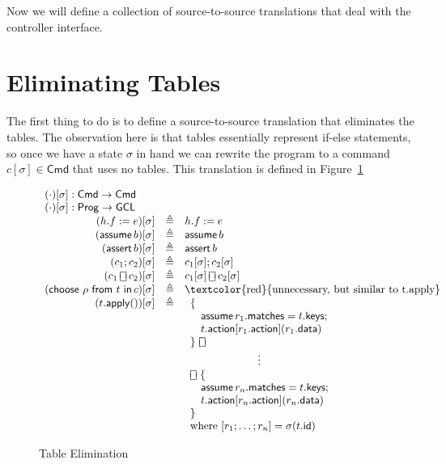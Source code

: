 \documentclass{article}
\newcommand{\Cmd}{\mathsf{Cmd}}
\newcommand{\Prog}{\mathsf{Prog}}
\newcommand{\GCL}{\mathsf{GCL}}
\newcommand{\matches}{\mathsf{matches}}
\newcommand{\action}{\mathsf{action}}
\newcommand{\keys}{\mathsf{keys}}
\newcommand{\data}{\mathsf{data}}
\newcommand{\id}{\mathsf{id}}
\newcommand{\assert}{\mathop{\mathsf{assert}}}
\newcommand{\assume}{\mathop{\mathsf{assume}}}
\newcommand{\apply}{\mathsf{apply}}
\newcommand{\choiceop}{\rotatebox[origin=c]{90}{$\sqsubset\!\!\!\sqsupset$}}
\newcommand{\choice}{\mathbin{\choiceop}}
\renewcommand{\choose}[2]{\mathop{\mathsf{choose}~#1~\mathsf{from}~#2~\mathsf{in}}}
\begin{document}
Now we will define a collection of source-to-source translations that deal with
the controller interface.

\section{Eliminating Tables}

The first thing to do is to define a source-to-source translation that
eliminates the tables. The observation here is that tables essentially represent
if-else statements, so once we have a state $\sigma$ in hand we can rewrite the
program to a command $c[\sigma] \in \Cmd$ that uses no tables. This translation
is defined in Figure~\ref{fig:table-elim}

\begin{figure}
  \[\begin{array}{r>{\triangleq}cl}
  \multicolumn{3}{l}{(\cdot)[\sigma] : \Cmd \to \Cmd} \\
  \multicolumn{3}{l}{(\cdot)[\sigma] : \Prog \to \GCL} \\
  (h.f := e)[\sigma] && h.f := e   \\
  (\assume b)[\sigma] && \assume b \\
  (\assert b)[\sigma] && \assert b \\
  (c_1;c_2)[\sigma] && c_1[\sigma];c_2[\sigma] \\
  (c_1 \choice c_2)[\sigma] && c_1[\sigma] \choice c_2[\sigma] \\
  (\choose \rho t c)[\sigma] && \textrm{\textcolor{red}{unnecessary, but similar to t.apply}}\\
  (t.\apply())[\sigma] &&
  \begin{array}[t]{l}
    \{\\
    \quad \assume {r_1.\matches = t.\keys};\\
    \quad t.\action[r_1.\action](r_1.\data)\\
    \}~\choice\\
    \multicolumn{1}{c}{\vdots}\\
    \choice~\{\\
    \quad \assume {r_n.\matches = t.\keys};\\
    \quad t.\action[r_n.\action](r_n.\data)\\
    \}\\
    \textrm{where}~[r_1;\ldots;r_n] = \sigma(t.\id)
  \end{array}
  \end{array}
  \]
  \caption{Table Elimination}
  \label{fig:table-elim}
\end{figure}
\end{document}
